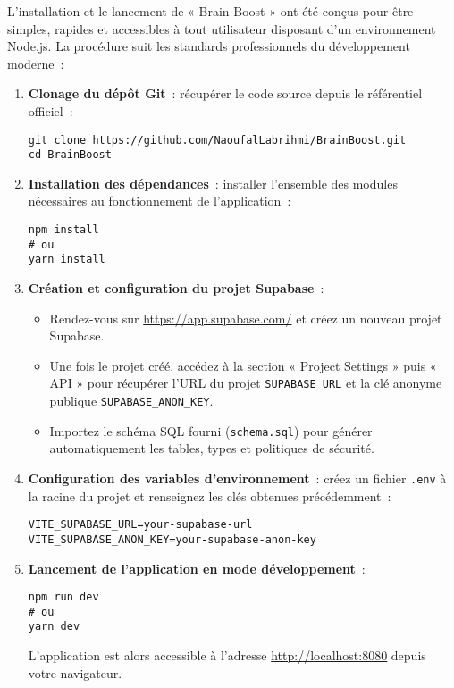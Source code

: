 \documentclass[a4paper,11pt]{report}
\begin{document}
L'installation et le lancement de « Brain Boost » ont été conçus pour être simples, rapides et accessibles à tout utilisateur disposant d'un environnement Node.js. La procédure suit les standards professionnels du développement moderne :
\begin{enumerate}
    \item \textbf{Clonage du dépôt Git} : récupérer le code source depuis le référentiel officiel :
    \begin{verbatim}
git clone https://github.com/NaoufalLabrihmi/BrainBoost.git
cd BrainBoost
    \end{verbatim}
    \item \textbf{Installation des dépendances} : installer l'ensemble des modules nécessaires au fonctionnement de l'application :
    \begin{verbatim}
npm install
# ou
yarn install
    \end{verbatim}
    \item \textbf{Création et configuration du projet Supabase} :
    \begin{itemize}
        \item Rendez-vous sur \url{https://app.supabase.com/} et créez un nouveau projet Supabase.
        \item Une fois le projet créé, accédez à la section « Project Settings » puis « API » pour récupérer l'URL du projet \texttt{SUPABASE\_URL} et la clé anonyme publique \texttt{SUPABASE\_ANON\_KEY}.
        \item Importez le schéma SQL fourni (\texttt{schema.sql}) pour générer automatiquement les tables, types et politiques de sécurité.
    \end{itemize}
    \item \textbf{Configuration des variables d'environnement} : créez un fichier \texttt{.env} à la racine du projet et renseignez les clés obtenues précédemment :
    \begin{verbatim}
VITE_SUPABASE_URL=your-supabase-url
VITE_SUPABASE_ANON_KEY=your-supabase-anon-key
    \end{verbatim}
    \item \textbf{Lancement de l'application en mode développement} :
    \begin{verbatim}
npm run dev
# ou
yarn dev
    \end{verbatim}
    L'application est alors accessible à l'adresse \url{http://localhost:8080} depuis votre navigateur.
\end{enumerate}
\end{document}
